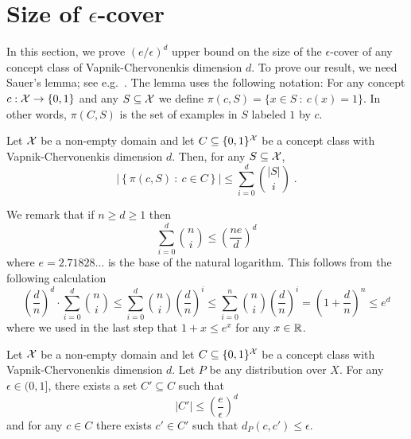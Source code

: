 \section{Size of $\epsilon$-cover}
\label{section:epsilon-cover}

In this section, we prove $(e/\epsilon)^d$ upper bound on the size of the
$\epsilon$-cover of any concept class of Vapnik-Chervonenkis dimension $d$. To
prove our result, we need Sauer's lemma; see e.g.~\cite[Chapter
3]{Anthony-Bartlett-1999}.  The lemma uses the following notation: For any
concept $c:\mathcal{X} \to \{0,1\}$ and any $S \subseteq \mathcal{X}$ we define $\pi(c,S) = \{x
\in S ~:~ c(x) = 1 \}$. In other words, $\pi(C,S)$ is the set of examples in $S$
labeled $1$ by $c$.

\begin{lemma}
Let $\mathcal{X}$ be a non-empty domain and let $C \subseteq \{0,1\}^{\mathcal{X}}$ be a concept class
with Vapnik-Chervonenkis dimension $d$. Then, for any $S \subseteq \mathcal{X}$,
$$
\left| \left\{ \pi(c, S) ~:~ c \in C \right\} \right| \le \sum_{i=0}^d \binom{|S|}{i} \; .
$$
\end{lemma}

We remark that if $n \ge d \ge 1$ then
\begin{equation}
\label{equation:sauer-lemma-estimate}
\sum_{i=0}^d \binom{n}{i} \le \left( \frac{ne}{d} \right)^d
\end{equation}
where $e = 2.71828 \dots$ is the base of the natural logarithm. This follows
from the following calculation
$$
\left( \frac{d}{n} \right)^d \cdot \sum_{i=0}^d \binom{n}{i}
\le \sum_{i=0}^d \binom{n}{i} \left( \frac{d}{n} \right)^i
\le \sum_{i=0}^n \binom{n}{i} \left( \frac{d}{n} \right)^i
= \left(1 + \frac{d}{n} \right)^n \le e^d
$$
where we used in the last step that $1 + x \le e^x$ for any $x \in \mathbb{R}$.


\begin{theorem}
Let $\mathcal{X}$ be a non-empty domain and let $C \subseteq \{0,1\}^{\mathcal{X}}$ be a concept
class with Vapnik-Chervonenkis dimension $d$. Let $P$ be any distribution over
$X$. For any $\epsilon \in (0,1]$, there exists a set $C' \subseteq C$ such that
\begin{equation}
\label{equation:theorem-epsilon-cover}
|C'| \le \left( \frac{e}{\epsilon} \right)^d
\end{equation}
and for any $c \in C$ there exists $c' \in C'$ such that $d_P(c,c') \le \epsilon$.
\end{theorem}


